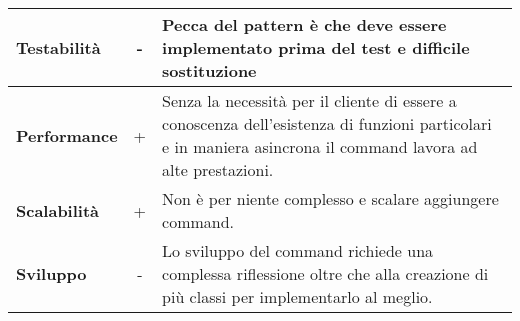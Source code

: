 {{{\begin{itemize}
{\begin{tabular}{|l|c|l|}
						\hline
						\textbf{Testabilità} & - & Pecca del pattern è che deve essere implementato prima del test e difficile sostituzione \\
						\hline
						\textbf{Performance} & + &  Senza la necessità per il cliente di essere a conoscenza dell'esistenza di funzioni particolari e in maniera asincrona il command lavora ad alte prestazioni. \\
						\hline
						\textbf{Scalabilità} & + & Non è per niente complesso e scalare aggiungere command. \\
						\hline
						\textbf{Sviluppo} & - & Lo sviluppo del command richiede una complessa riflessione oltre che alla creazione di più classi per implementarlo al meglio.\\
						\hline
					\end{tabular}
				}
			\end{itemize}
		}
	}
}